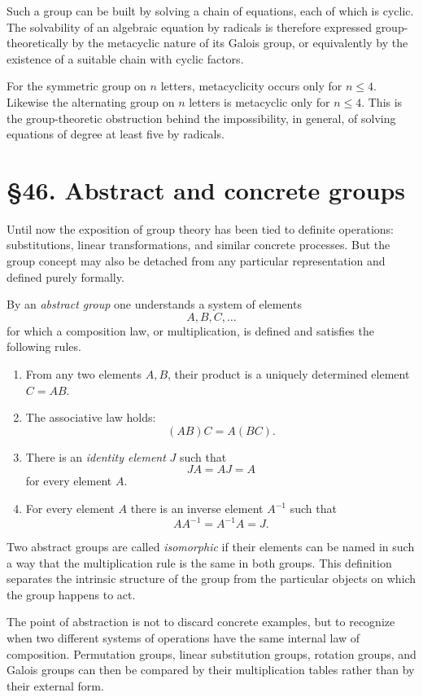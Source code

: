 \documentclass[11pt,a4paper]{book}
\newcommand{\webersection}[2]{\clearpage\section*{\S #1. #2}}
\begin{document}
Such a group can be built by solving a chain of equations, each of which is cyclic.  The solvability of an algebraic equation by radicals is therefore expressed group-theoretically by the metacyclic nature of its Galois group, or equivalently by the existence of a suitable chain with cyclic factors.

For the symmetric group on \(n\) letters, metacyclicity occurs only for \(n\leq 4\).  Likewise the alternating group on \(n\) letters is metacyclic only for \(n\leq 4\).  This is the group-theoretic obstruction behind the impossibility, in general, of solving equations of degree at least five by radicals.

\webersection{46}{Abstract and concrete groups}

Until now the exposition of group theory has been tied to definite operations: substitutions, linear transformations, and similar concrete processes.  But the group concept may also be detached from any particular representation and defined purely formally.

By an \emph{abstract group} one understands a system of elements
\[
A,B,C,\ldots
\]
for which a composition law, or multiplication, is defined and satisfies the following rules.

\begin{enumerate}[label=\arabic*.]
\item From any two elements \(A,B\), their product is a uniquely determined element \(C=AB\).
\item The associative law holds:
\[
(AB)C=A(BC).
\]
\item There is an \emph{identity element} \(J\) such that
\[
JA=AJ=A
\]
for every element \(A\).
\item For every element \(A\) there is an inverse element \(A^{-1}\) such that
\[
AA^{-1}=A^{-1}A=J.
\]
\end{enumerate}

Two abstract groups are called \emph{isomorphic} if their elements can be named in such a way that the multiplication rule is the same in both groups.  This definition separates the intrinsic structure of the group from the particular objects on which the group happens to act.

The point of abstraction is not to discard concrete examples, but to recognize when two different systems of operations have the same internal law of composition.  Permutation groups, linear substitution groups, rotation groups, and Galois groups can then be compared by their multiplication tables rather than by their external form.
\end{document}

